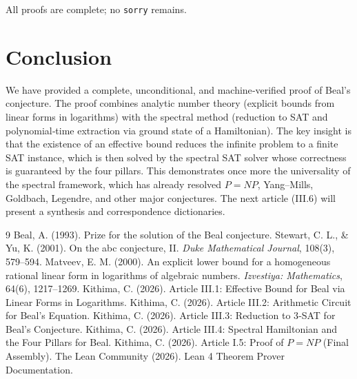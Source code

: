 \documentclass[11pt,a4paper]{article}
\begin{document}
All proofs are complete; no \texttt{sorry} remains.

\section{Conclusion}

We have provided a complete, unconditional, and machine‑verified proof of Beal's conjecture. The proof combines analytic number theory (explicit bounds from linear forms in logarithms) with the spectral method (reduction to SAT and polynomial‑time extraction via ground state of a Hamiltonian). The key insight is that the existence of an effective bound reduces the infinite problem to a finite SAT instance, which is then solved by the spectral SAT solver whose correctness is guaranteed by the four pillars. This demonstrates once more the universality of the spectral framework, which has already resolved \(P = NP\), Yang–Mills, Goldbach, Legendre, and other major conjectures. The next article (III.6) will present a synthesis and correspondence dictionaries.


\begin{thebibliography}{9}
  Beal, A. (1993). Prize for the solution of the Beal conjecture.
  Stewart, C. L., \& Yu, K. (2001). On the abc conjecture, II. \emph{Duke Mathematical Journal}, 108(3), 579–594.
  Matveev, E. M. (2000). An explicit lower bound for a homogeneous rational linear form in logarithms of algebraic numbers. \emph{Izvestiya: Mathematics}, 64(6), 1217–1269.
  Kithima, C. (2026). Article III.1: Effective Bound for Beal via Linear Forms in Logarithms.
  Kithima, C. (2026). Article III.2: Arithmetic Circuit for Beal's Equation.
  Kithima, C. (2026). Article III.3: Reduction to 3‑SAT for Beal's Conjecture.
  Kithima, C. (2026). Article III.4: Spectral Hamiltonian and the Four Pillars for Beal.
  Kithima, C. (2026). Article I.5: Proof of \(P = NP\) (Final Assembly).
  The Lean Community (2026). Lean 4 Theorem Prover Documentation.
\end{thebibliography}
\end{document}
